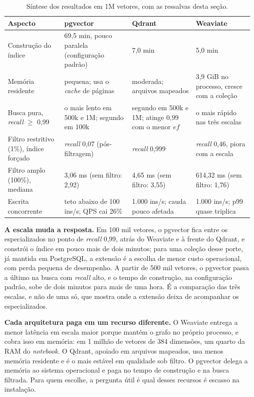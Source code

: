 \begin{table}[H]
\centering
\caption{Síntese dos resultados em 1M vetores, com as ressalvas desta seção.}
\label{tab:sintese}
\renewcommand{\arraystretch}{1.2}
\footnotesize
\begin{tabularx}{\textwidth}{|l|X|X|X|}
\hline
\textbf{Aspecto} & \textbf{pgvector} & \textbf{Qdrant} & \textbf{Weaviate} \\
\hline
Construção do índice & 69,5 min, pouco paralela (configuração padrão) & 7,0 min & 5,0 min \\
\hline
Memória residente & pequena; usa o \textit{cache} de páginas & moderada; arquivos mapeados & 3,9 GiB no processo, cresce com a coleção \\
\hline
Busca pura, \textit{recall} $\geq$ 0,99 & o mais lento em 500k e 1M; segundo em 100k & segundo em 500k e 1M; atinge 0,99 com o menor $ef$ & o mais rápido nas três escalas \\
\hline
Filtro restritivo (1\%), índice forçado & \textit{recall} 0,07 (pós-filtragem) & \textit{recall} 0,999 & \textit{recall} 0,46, piora com a escala \\
\hline
Filtro amplo (100\%), mediana & 3,06 ms (sem filtro: 2,92) & 4,65 ms (sem filtro: 3,55) & 614,32 ms (sem filtro: 1,76) \\
\hline
Escrita concorrente & teto abaixo de 100 ins/s; QPS cai 26\% & 1.000 ins/s; cauda pouco afetada & 1.000 ins/s; p99 quase triplica \\
\hline
\end{tabularx}
\end{table}

\textbf{A escala muda a resposta.} Em 100 mil vetores, o pgvector fica entre os especializados no ponto de \textit{recall} 0,99, atrás do Weaviate e à frente do Qdrant, e constrói o índice em pouco mais de dois minutos; para uma coleção desse porte, já mantida em PostgreSQL, a extensão é a escolha de menor custo operacional, com perda pequena de desempenho. A partir de 500 mil vetores, o pgvector passa a último na busca com \textit{recall} alto, e o tempo de construção, na configuração padrão, sobe de dois minutos para mais de uma hora. É a comparação das três escalas, e não de uma só, que mostra onde a extensão deixa de acompanhar os especializados.

\textbf{Cada arquitetura paga em um recurso diferente.} O Weaviate entrega a menor latência em escala maior porque mantém o grafo no próprio processo, e cobra isso em memória: em 1 milhão de vetores de 384 dimensões, um quarto da RAM do \textit{notebook}. O Qdrant, apoiado em arquivos mapeados, usa menos memória residente e é o mais estável em qualidade sob filtro. O pgvector delega a memória ao sistema operacional e paga no tempo de construção e na busca filtrada. Para quem escolhe, a pergunta útil é qual desses recursos é escasso na instalação.

